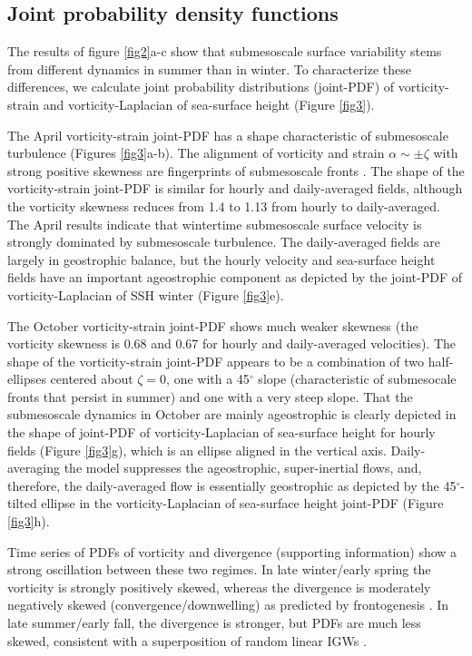 \documentclass[grl]{agutex2015}
\begin{document}
\begin{article}
\section{Joint probability density functions}

The results of figure \ref{fig2}a-c show that submesoscale surface
 variability stems from different dynamics in summer than in winter.
 To characterize these differences, we calculate
joint probability distributions (joint-PDF) of
vorticity-strain and vorticity-Laplacian of sea-surface height (Figure \ref{fig3}).

The April vorticity-strain joint-PDF has a shape characteristic of submesoscale turbulence
 (Figures \ref{fig3}a-b). The alignment of vorticity and strain $\alpha \sim \pm\zeta$
 with strong positive skewness are fingerprints of submesoscale fronts
 \citep{shcherbina_etal2013,mcwilliams2016}. The shape of the vorticity-strain
 joint-PDF is similar for hourly and daily-averaged fields, although
 the vorticity skewness reduces from 1.4 to 1.13 from hourly to daily-averaged.
 The April results indicate that wintertime submesoscale
 surface velocity is strongly dominated by submesoscale turbulence.
 The daily-averaged fields
 are largely in  geostrophic balance,
but the hourly velocity and sea-surface height fields have an important
ageostrophic component as depicted by the joint-PDF of vorticity-Laplacian of SSH
winter (Figure \ref{fig3}e).

The October vorticity-strain joint-PDF shows much weaker skewness (the vorticity skewness
is 0.68 and 0.67 for hourly and daily-averaged velocities). The shape of the
vorticity-strain joint-PDF  appears to be a combination of two half-ellipses centered
about $\zeta=0$, one with a 45$^\circ$ slope (characteristic of submesocale fronts
that persist in summer) and one with a very steep slope.
That the submesoscale dynamics in October are mainly ageostrophic is clearly depicted
in the shape of joint-PDF of vorticity-Laplacian of sea-surface height for hourly fields
 (Figure \ref{fig3}g), which is an ellipse aligned in the vertical axis.
Daily-averaging the model suppresses the ageostrophic, super-inertial flows, and, therefore,
the daily-averaged flow is essentially geostrophic as depicted by the 45$^\circ$-tilted
ellipse in the vorticity-Laplacian of sea-surface height joint-PDF (Figure \ref{fig3}h).

 Time series of PDFs of vorticity and divergence (supporting information) show
 a strong oscillation between these two regimes. In late winter/early spring
 the vorticity is strongly positively skewed, whereas the divergence is moderately
 negatively skewed (convergence/downwelling) as predicted by frontogenesis \citep[e.g., ][]{mcwilliams2016}.
 In late summer/early fall, the divergence is stronger, but PDFs are much less skewed,
consistent with a superposition of random linear IGWs \citep[e.g.,][]{garrett_munk1972}.


\end{article}
\end{document}
